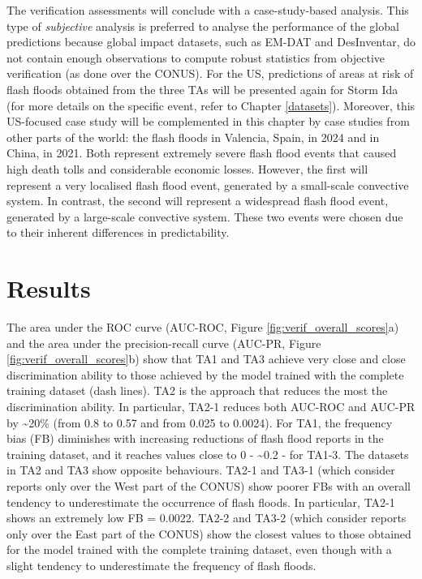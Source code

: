 The verification assessments will conclude with a case-study-based analysis. This type of \textit{subjective} analysis is preferred to analyse the performance of the global predictions because global impact datasets, such as EM-DAT and DesInventar, do not contain enough observations to compute robust statistics from objective verification (as done over the CONUS). For the US, predictions of areas at risk of flash floods obtained from the three TAs will be presented again for Storm Ida (for more details on the specific event, refer to Chapter \ref{datasets}). Moreover, this US-focused case study will be complemented in this chapter by case studies from other parts of the world: the flash floods in Valencia, Spain, in 2024 and in China, in 2021. Both represent extremely severe flash flood events that caused high death tolls and considerable economic losses. However, the first will represent a very localised flash flood event, generated by a small-scale convective system. In contrast, the second will represent a widespread flash flood event, generated by a large-scale convective system. These two events were chosen due to their inherent differences in predictability.


\section{Results}
\label{regional_to_global_training_results}

The  area under the ROC curve (AUC-ROC, Figure \ref{fig:verif_overall_scores}a) and the area under the precision-recall curve (AUC-PR, Figure \ref{fig:verif_overall_scores}b) show that TA1 and TA3 achieve very close and close discrimination ability to those achieved by the model trained with the complete training dataset (dash lines). TA2 is the approach that reduces the most the discrimination ability. In particular, TA2-1 reduces both AUC-ROC and AUC-PR by \sim20\% (from 0.8 to 0.57 and from 0.025 to 0.0024). For TA1, the frequency bias (FB) diminishes with increasing reductions of flash flood reports in the training dataset, and it reaches values close to 0 - \sim0.2 - for TA1-3. The datasets in TA2 and TA3 show opposite behaviours. TA2-1 and TA3-1 (which consider reports only over the West part of the CONUS) show poorer FBs with an overall tendency to underestimate the occurrence of flash floods. In particular, TA2-1 shows an extremely low FB = 0.0022. TA2-2 and TA3-2 (which consider reports only over the East part of the CONUS) show the closest values to those obtained for the model trained with the complete training dataset, even though with a slight tendency to underestimate the frequency of flash floods.

